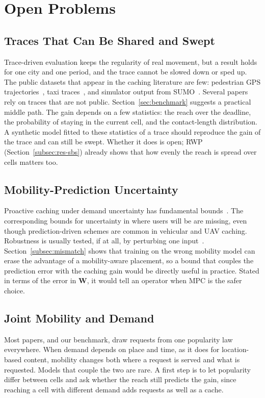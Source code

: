 
\section{Open Problems}
\label{sec:open}

\subsection{Traces That Can Be Shared and Swept}
Trace-driven evaluation keeps the regularity of real movement, but a result holds for one city and one period, and the trace cannot be slowed down or sped up. The public datasets that appear in the caching literature are few: pedestrian GPS trajectories~\cite{zheng2010geolife}, taxi traces~\cite{piorkowski2009parsimonious}, and simulator output from SUMO~\cite{lopez2018sumo}. Several papers rely on traces that are not public. Section~\ref{sec:benchmark} suggests a practical middle path. The gain depends on a few statistics: the reach over the deadline, the probability of staying in the current cell, and the contact-length distribution. A synthetic model fitted to these statistics of a trace should reproduce the gain of the trace and can still be swept. Whether it does is open; RWP (Section~\ref{subsec:res-sbs}) already shows that how evenly the reach is spread over cells matters too.

\subsection{Mobility-Prediction Uncertainty}
Proactive caching under demand uncertainty has fundamental bounds~\cite{tadrous2016optimal}. The corresponding bounds for uncertainty in where users will be are missing, even though prediction-driven schemes are common in vehicular and UAV caching. Robustness is usually tested, if at all, by perturbing one input~\cite{mahmood2019rich}. Section~\ref{subsec:mismatch} shows that training on the wrong mobility model can erase the advantage of a mobility-aware placement, so a bound that couples the prediction error with the caching gain would be directly useful in practice. Stated in terms of the error in $\mathbf{W}$, it would tell an operator when MPC is the safer choice.

\subsection{Joint Mobility and Demand}
Most papers, and our benchmark, draw requests from one popularity law everywhere. When demand depends on place and time, as it does for location-based content, mobility changes both where a request is served and what is requested. Models that couple the two are rare. A first step is to let popularity differ between cells and ask whether the reach still predicts the gain, since reaching a cell with different demand adds requests as well as a cache.

